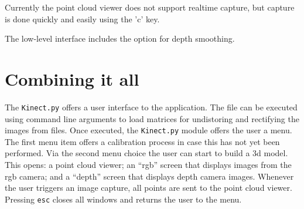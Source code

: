 Currently the point cloud viewer does not support realtime capture, but capture
is done quickly and easily using the 'c' key.

The low-level interface includes the option for depth smoothing.

\section{Combining it all}


The \texttt{Kinect.py} offers a user interface to the application. The file can
be executed using command line arguments to load matrices for undistoring and
rectifying the images from files. Once executed, the \texttt{Kinect.py} module
offers the user a menu. The first menu item offers a calibration process in case
this has not yet been performed.  Via the second menu choice the user can start
to build a 3d model. This opens: a point cloud viewer; an ``rgb'' screen that
displays images from the rgb camera; and a ``depth'' screen that displays depth
camera images. Whenever the user triggers an image capture, all points are sent
to the point cloud viewer. Pressing \texttt{esc} closes all windows and returns
the user to the menu.
